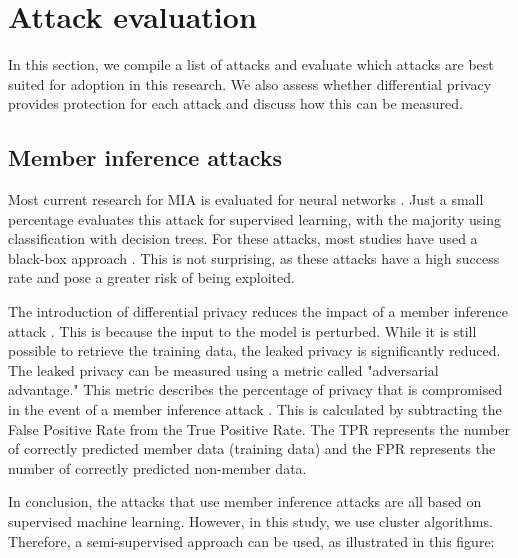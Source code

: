 



\section{Attack evaluation} \label{theory:attack-evaluation}
In this section, we compile a list of attacks and evaluate which attacks are best suited for adoption in this research.
We also assess whether differential privacy provides protection for each attack and discuss how this can be measured.
\subsection{Member inference attacks}
Most current research for MIA is evaluated for neural networks \citep{rigaki_survey_2021}.
Just a small percentage evaluates this attack for supervised learning, with the majority using classification with decision trees.
For these attacks, most studies have used a black-box approach \citep{rigaki_survey_2021}.
This is not surprising, as these attacks have a high success rate and pose a greater risk of being exploited.

The introduction of differential privacy reduces the impact of a member inference attack \citep{rigaki_survey_2021,hu_membership_2022}.
This is because the input to the model is perturbed. While it is still possible to retrieve the training data, the leaked privacy is significantly reduced.
The leaked privacy can be measured using a metric called "adversarial advantage." This metric describes the percentage of privacy that is compromised in the event of a member inference attack \citep{yeom_privacy_2018}.
This is calculated by subtracting the False Positive Rate from the True Positive Rate. The TPR represents the number of correctly predicted member data (training data) and the FPR represents the number of correctly predicted non-member data. \newline

In conclusion, the attacks that use member inference attacks are all based on supervised machine learning.
However, in this study, we use cluster algorithms.
Therefore, a semi-supervised approach can be used, as illustrated in this figure:

